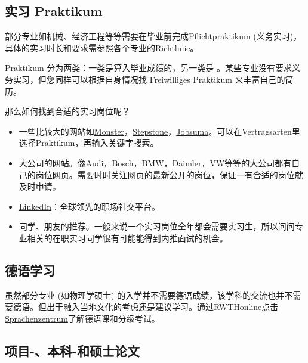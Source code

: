   \subsection{实习 Praktikum}\label{subsec:实习 Praktikum}

    部分专业如机械、经济工程等等需要在毕业前完成Pflichtpraktikum (义务实习)，具体的实习时长和要求需参照各个专业的Richtlinie。

    Praktikum 分为两类：一类是算入毕业成绩的，另一类是 。某些专业没有要求义务实习，但您同样可以根据自身情况找 Freiwilliges Praktikum 来丰富自己的简历。

    那么如何找到合适的实习岗位呢？

    \begin{itemize}
      \item 一些比较大的网站如\href{https://www.monster.com/}{Monster}，\href{https://www.stepstone.de/en/}{Stepstone}，\href{https://www.jobsuma.de/}{Jobsuma}。可以在Vertragsarten里选择Praktikum，再输入关键字搜索。
      \item 大公司的网站。像\href{https://www.audi.de/de/brand/de.html}{Audi}，\href{https://www.bosch.de/}{Bosch}，\href{https://www.bmw.de/de/home.html}{BMW}，\href{https://www.daimler.com/en/}{Daimler}，\href{https://www.volkswagen.de/de.html}{VW}等等的大公司都有自己的岗位网页。需要时时关注网页的最新公开的岗位，保证一有合适的岗位就及时申请。
      \item \href{https://www.linkedin.com/}{LinkedIn}：全球领先的职场社交平台。
      \item 同学、朋友的推荐。一般来说一个实习岗位全年都会需要实习生，所以问问专业相关的在职实习同学很有可能能得到内推面试的机会。
    \end{itemize}

  \subsection{德语学习}\label{subsec:德语学习}

    虽然部分专业 (如物理学硕士) 的入学并不需要德语成绩，该学科的交流也并不需要德语。但出于融入当地文化的考虑还是建议学习。通过RWTHonline点击\href{https://www.sz.rwth-aachen.de/cms/~iilg/sz/}{Sprachenzentrum}了解德语课和分级考试。

  \subsection{项目-、本科-和硕士论文}\label{subsec:项目-、本科-和硕士论文}


